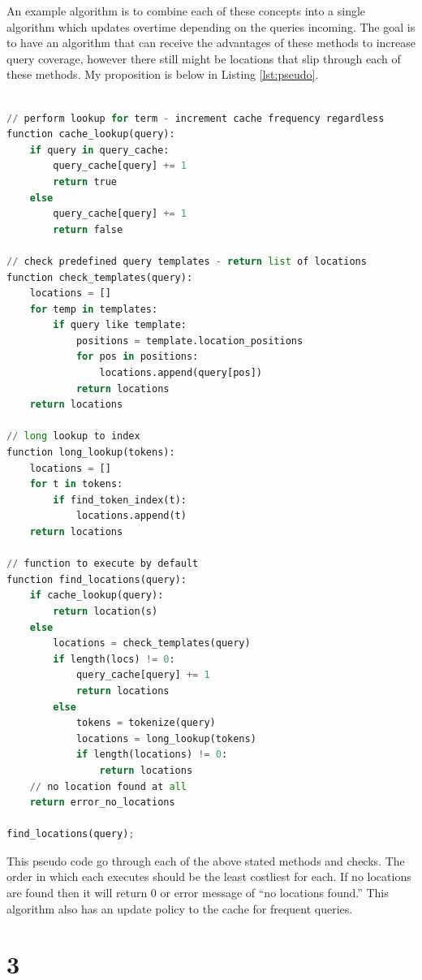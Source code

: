 \documentclass[letterpaper,11pt]{article}
\begin{document}
An example algorithm is to combine each of these concepts into a single algorithm which updates overtime depending on the queries incoming.
The goal is to have an algorithm that can receive the advantages of these methods to increase query coverage, however there still might be locations that slip through each of these methods. My proposition is below in Listing \ref{lst:pseudo}.

\begin{lstlisting}[language=python, caption={Pseudo code algorithm for Location detection in queries}, label={lst:pseudo}]

// perform lookup for term - increment cache frequency regardless
function cache_lookup(query):
	if query in query_cache:
		query_cache[query] += 1
		return true
	else
		query_cache[query] += 1
		return false

// check predefined query templates - return list of locations
function check_templates(query):
	locations = []
	for temp in templates:
		if query like template:
			positions = template.location_positions
			for pos in positions:
				locations.append(query[pos])
			return locations
	return locations

// long lookup to index
function long_lookup(tokens):
	locations = []
	for t in tokens:
		if find_token_index(t):
			locations.append(t)
	return locations			
	
// function to execute by default
function find_locations(query):
	if cache_lookup(query):
		return location(s)
	else
		locations = check_templates(query)
		if length(locs) != 0:
			query_cache[query] += 1
			return locations
		else
			tokens = tokenize(query)
			locations = long_lookup(tokens)
			if length(locations) != 0:
				return locations
	// no location found at all
	return error_no_locations

find_locations(query);
\end{lstlisting}

This pseudo code go through each of the above stated methods and checks.
The order in which each executes should be the least costliest for each.
If no locations are found then it will return 0 or error message of ``no locations found.''
This algorithm also has an update policy to the cache for frequent queries.

\clearpage


\section*{3}
\end{document}
